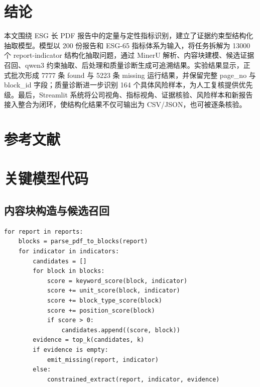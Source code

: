 \documentclass[bwprint]{gmcmthesis}
\numberwithin{figure}{section}
\begin{document}
\section{结论}
本文围绕 ESG 长 PDF 报告中的定量与定性指标识别，建立了证据约束型结构化抽取模型。模型以 200 份报告和 ESG-65 指标体系为输入，将任务拆解为 13000 个 report-indicator 结构化抽取问题，通过 MinerU 解析、内容块建模、候选证据召回、qwen3 约束抽取、后处理和质量诊断生成可追溯结果。实验结果显示，正式批次形成 7777 条 found 与 5223 条 missing 运行结果，并保留完整 page\_no 与 block\_id 字段；质量诊断进一步识别 164 个具体风险样本，为人工复核提供优先级。最后，Streamlit 系统将公司视角、指标视角、证据核验、风险样本和新报告接入整合为闭环，使结构化结果不仅可输出为 CSV/JSON，也可被逐条核验。

\newpage
\section{参考文献}
\printbibliography[heading=none]

\newpage
\appendix
\section{关键模型代码}
\subsection{内容块构造与候选召回}
\begin{Verbatim}[fontsize=\small,frame=single]
for report in reports:
    blocks = parse_pdf_to_blocks(report)
    for indicator in indicators:
        candidates = []
        for block in blocks:
            score = keyword_score(block, indicator)
            score += unit_score(block, indicator)
            score += block_type_score(block)
            score += position_score(block)
            if score > 0:
                candidates.append((score, block))
        evidence = top_k(candidates, k)
        if evidence is empty:
            emit_missing(report, indicator)
        else:
            constrained_extract(report, indicator, evidence)
\end{Verbatim}
\end{document}
